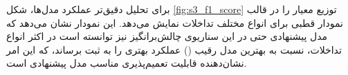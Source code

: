 \begin{table}[t]
	\caption{مقایسه نتایج مدل پیشنهادی با سایر مدل‌ها در سناریوی دوم}
	\label{table:scenario3_results}
	\centering %
	\renewcommand{\arraystretch}{2.5} 
\end{table}

برای تحلیل دقیق‌تر عملکرد مدل‌ها، شکل \ref{fig:s3_f1_score} توزیع معیار  را در قالب نمودار قطبی برای انواع مختلف تداخلات نمایش می‌دهد. این نمودار نشان می‌دهد که مدل پیشنهادی حتی در این سناریوی چالش‌برانگیز نیز توانسته است در اکثر انواع تداخلات، نسبت به بهترین مدل رقیب () عملکرد بهتری را به ثبت برساند، که این امر نشان‌دهنده قابلیت تعمیم‌پذیری مناسب مدل پیشنهادی است.


